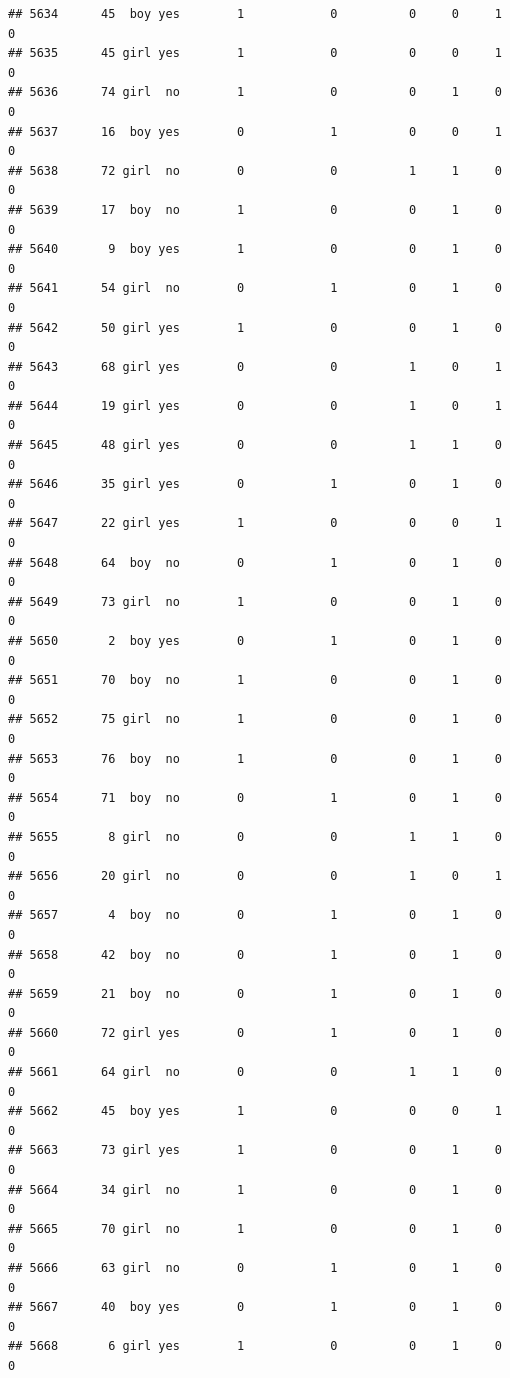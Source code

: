 \documentclass[man]{apa6}
\begin{document}
\begin{verbatim}
## 5634      45  boy yes        1            0          0     0     1     0
## 5635      45 girl yes        1            0          0     0     1     0
## 5636      74 girl  no        1            0          0     1     0     0
## 5637      16  boy yes        0            1          0     0     1     0
## 5638      72 girl  no        0            0          1     1     0     0
## 5639      17  boy  no        1            0          0     1     0     0
## 5640       9  boy yes        1            0          0     1     0     0
## 5641      54 girl  no        0            1          0     1     0     0
## 5642      50 girl yes        1            0          0     1     0     0
## 5643      68 girl yes        0            0          1     0     1     0
## 5644      19 girl yes        0            0          1     0     1     0
## 5645      48 girl yes        0            0          1     1     0     0
## 5646      35 girl yes        0            1          0     1     0     0
## 5647      22 girl yes        1            0          0     0     1     0
## 5648      64  boy  no        0            1          0     1     0     0
## 5649      73 girl  no        1            0          0     1     0     0
## 5650       2  boy yes        0            1          0     1     0     0
## 5651      70  boy  no        1            0          0     1     0     0
## 5652      75 girl  no        1            0          0     1     0     0
## 5653      76  boy  no        1            0          0     1     0     0
## 5654      71  boy  no        0            1          0     1     0     0
## 5655       8 girl  no        0            0          1     1     0     0
## 5656      20 girl  no        0            0          1     0     1     0
## 5657       4  boy  no        0            1          0     1     0     0
## 5658      42  boy  no        0            1          0     1     0     0
## 5659      21  boy  no        0            1          0     1     0     0
## 5660      72 girl yes        0            1          0     1     0     0
## 5661      64 girl  no        0            0          1     1     0     0
## 5662      45  boy yes        1            0          0     0     1     0
## 5663      73 girl yes        1            0          0     1     0     0
## 5664      34 girl  no        1            0          0     1     0     0
## 5665      70 girl  no        1            0          0     1     0     0
## 5666      63 girl  no        0            1          0     1     0     0
## 5667      40  boy yes        0            1          0     1     0     0
## 5668       6 girl yes        1            0          0     1     0     0

\end{verbatim}
\end{document}
